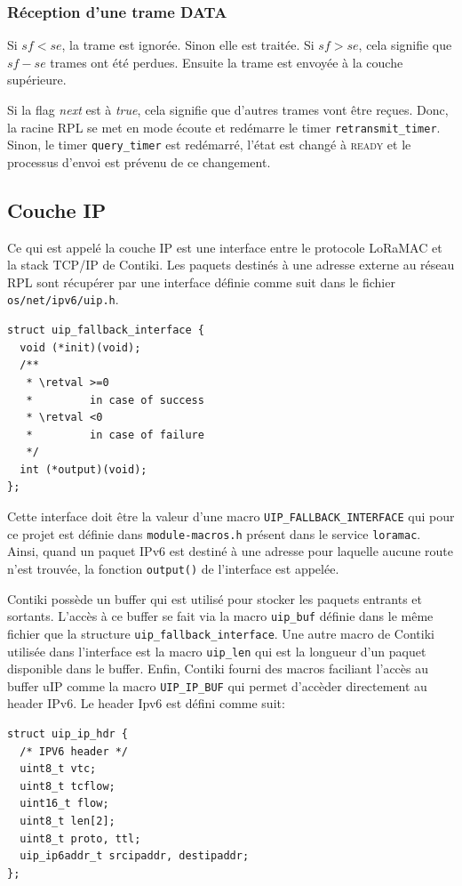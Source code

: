     \subsubsection*{Réception d'une trame DATA}
        Si $sf<se$, la trame est ignorée. Sinon elle est traitée. Si $sf > se$, cela signifie que $sf - se$ trames ont été perdues. Ensuite la trame est envoyée à la couche supérieure.

        Si la flag \textit{next} est à \textit{true}, cela signifie que d'autres trames vont être reçues. Donc, la racine RPL se met en mode écoute et redémarre le timer \texttt{retransmit\_timer}. Sinon, le timer \texttt{query\_timer} est redémarré, l'état est changé à \textsc{ready} et le processus d'envoi est prévenu de ce changement.


\subsection*{Couche IP}
    Ce qui est appelé la couche IP est une interface entre le protocole LoRaMAC et la stack TCP/IP de Contiki. Les paquets destinés à une adresse externe au réseau RPL sont récupérer par une interface définie comme suit dans le fichier \texttt{os/net/ipv6/uip.h}.
    \begin{verbatim}
struct uip_fallback_interface {
  void (*init)(void);
  /**
   * \retval >=0
   *         in case of success
   * \retval <0
   *         in case of failure
   */
  int (*output)(void);
};
    \end{verbatim}
    Cette interface doit être la valeur d'une macro \texttt{UIP\_FALLBACK\_INTERFACE} qui pour ce projet est définie dans \texttt{module-macros.h} présent dans le service \texttt{loramac}.
    Ainsi, quand un paquet IPv6 est destiné à une adresse pour laquelle aucune route n'est trouvée, la fonction  \texttt{output()} de l'interface est appelée.

    Contiki possède un buffer qui est utilisé pour stocker les paquets entrants et sortants.
    L'accès à ce buffer se fait via la macro \texttt{uip\_buf} définie dans le même fichier que la structure \texttt{uip\_fallback\_interface}. Une autre macro de Contiki utilisée dans l'interface est la macro \texttt{uip\_len} qui est la longueur d'un paquet disponible dans le buffer. Enfin, Contiki fourni des macros faciliant l'accès au buffer uIP comme la macro \texttt{UIP\_IP\_BUF} qui permet d'accèder directement au header IPv6. Le header Ipv6 est défini comme suit:
    \begin{verbatim}
struct uip_ip_hdr {
  /* IPV6 header */
  uint8_t vtc;
  uint8_t tcflow;
  uint16_t flow;
  uint8_t len[2];
  uint8_t proto, ttl;
  uip_ip6addr_t srcipaddr, destipaddr;
};
    \end{verbatim}

